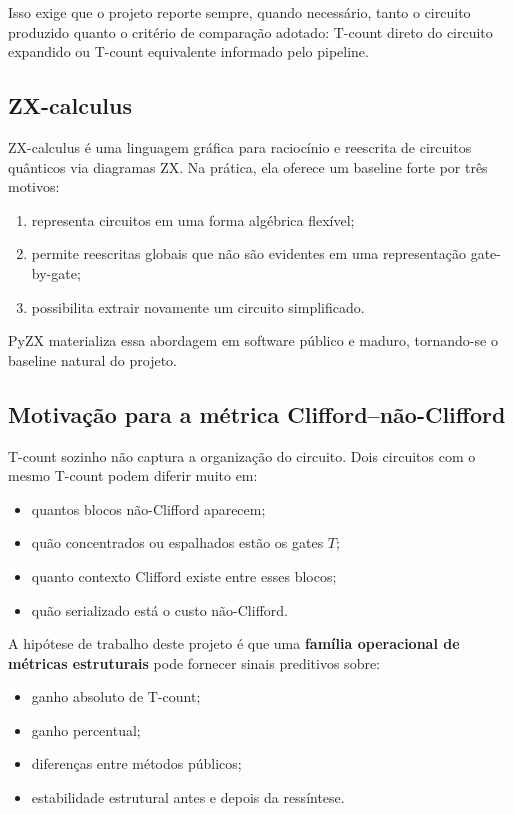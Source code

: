 \documentclass[a4paper,11pt]{article}
\begin{document}
Isso exige que o projeto reporte sempre, quando necessário, tanto o circuito produzido quanto o critério de comparação adotado: T-count direto do circuito expandido ou T-count equivalente informado pelo pipeline.

\subsection*{ZX-calculus}

ZX-calculus é uma linguagem gráfica para raciocínio e reescrita de circuitos quânticos via diagramas ZX. Na prática, ela oferece um baseline forte por três motivos:
\begin{enumerate}
  \item representa circuitos em uma forma algébrica flexível;
  \item permite reescritas globais que não são evidentes em uma representação gate-by-gate;
  \item possibilita extrair novamente um circuito simplificado.
\end{enumerate}

PyZX materializa essa abordagem em software público e maduro, tornando-se o baseline natural do projeto.

\subsection*{Motivação para a métrica Clifford--não-Clifford}

T-count sozinho não captura a organização do circuito. Dois circuitos com o mesmo T-count podem diferir muito em:
\begin{itemize}
  \item quantos blocos não-Clifford aparecem;
  \item quão concentrados ou espalhados estão os gates $T$;
  \item quanto contexto Clifford existe entre esses blocos;
  \item quão serializado está o custo não-Clifford.
\end{itemize}

A hipótese de trabalho deste projeto é que uma \textbf{família operacional de métricas estruturais} pode fornecer sinais preditivos sobre:
\begin{itemize}
  \item ganho absoluto de T-count;
  \item ganho percentual;
  \item diferenças entre métodos públicos;
  \item estabilidade estrutural antes e depois da ressíntese.
\end{itemize}
\end{document}
